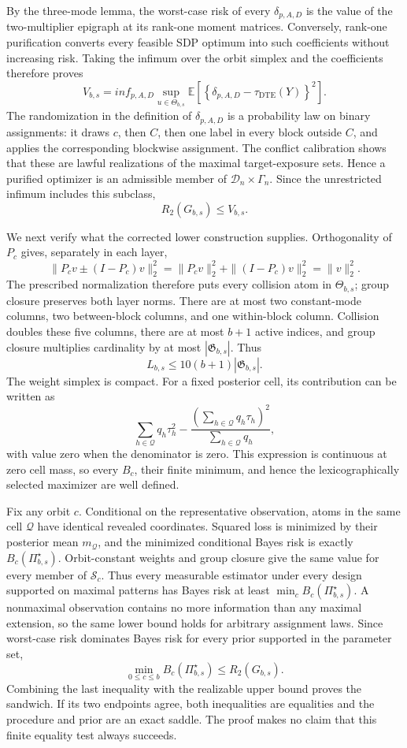 By the three-mode lemma, the worst-case risk of every \(\delta_{p,A,D}\) is the value of the two-multiplier epigraph at its rank-one moment matrices.  Conversely, rank-one purification converts every feasible SDP optimum into such coefficients without increasing risk.  Taking the infimum over the orbit simplex and the coefficients therefore proves
\[
V_{b,s}=inf_{p,A,D}\sup_{u\in\Theta_{b,s}}
\mathbb E\!\left[\left\{\delta_{p,A,D}-\tau_{\mathrm{DTE}}(Y)\right\}^2\right].
\]
The randomization in the definition of \(\delta_{p,A,D}\) is a probability law on binary assignments: it draws \(c\), then \(C\), then one label in every block outside \(C\), and applies the corresponding blockwise assignment.  The conflict calibration shows that these are lawful realizations of the maximal target-exposure sets.  Hence a purified optimizer is an admissible member of \(\mathcal D_n\times\Gamma_n\).  Since the unrestricted infimum includes this subclass,
\[
R_2(G_{b,s})\le V_{b,s}.
\]

We next verify what the corrected lower construction supplies.  Orthogonality of \(P_c\) gives, separately in each layer,
\[
\|P_cv\pm(I-P_c)v\|_2^2
=\|P_cv\|_2^2+\|(I-P_c)v\|_2^2
=\|v\|_2^2.
\]
The prescribed normalization therefore puts every collision atom in \(\Theta_{b,s}\); group closure preserves both layer norms.  There are at most two constant-mode columns, two between-block columns, and one within-block column.  Collision doubles these five columns, there are at most \(b+1\) active indices, and group closure multiplies cardinality by at most \(|\mathfrak G_{b,s}|\).  Thus
\[
L_{b,s}\le10(b+1)|\mathfrak G_{b,s}|.
\]
The weight simplex is compact.  For a fixed posterior cell, its contribution can be written as
\[
\sum_{h\in\mathcal Q}q_h\tau_h^2
-\frac{\left(\sum_{h\in\mathcal Q}q_h\tau_h\right)^2}
{\sum_{h\in\mathcal Q}q_h},
\]
with value zero when the denominator is zero.  This expression is continuous at zero cell mass, so every \(B_c\), their finite minimum, and hence the lexicographically selected maximizer are well defined.

Fix any orbit \(c\).  Conditional on the representative observation, atoms in the same cell \(\mathcal Q\) have identical revealed coordinates.  Squared loss is minimized by their posterior mean \(m_{\mathcal Q}\), and the minimized conditional Bayes risk is exactly \(B_c(\Pi_{b,s}^{\star})\).  Orbit-constant weights and group closure give the same value for every member of \(\mathcal S_c\).  Thus every measurable estimator under every design supported on maximal patterns has Bayes risk at least
\(\min_cB_c(\Pi_{b,s}^{\star})\).  A nonmaximal observation contains no more information than any maximal extension, so the same lower bound holds for arbitrary assignment laws.  Since worst-case risk dominates Bayes risk for every prior supported in the parameter set,
\[
\min_{0\le c\le b}B_c(\Pi_{b,s}^{\star})\le R_2(G_{b,s}).
\]
Combining the last inequality with the realizable upper bound proves the sandwich.  If its two endpoints agree, both inequalities are equalities and the procedure and prior are an exact saddle.  The proof makes no claim that this finite equality test always succeeds.